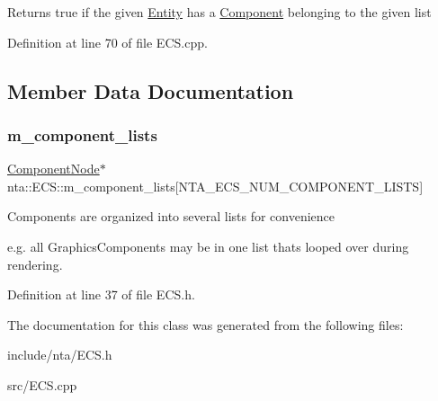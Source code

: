 Returns true if the given \hyperlink{classnta_1_1Entity}{Entity} has a \hyperlink{classnta_1_1Component}{Component} belonging to the given list 

Definition at line 70 of file E\+C\+S.\+cpp.



\subsection{Member Data Documentation}
\mbox{\label{classnta_1_1ECS_a2d45b9e54bcc636faac7cbb403b478bd}} 
\subsubsection{\texorpdfstring{m\+\_\+component\+\_\+lists}{m\_component\_lists}}
{\footnotesize\ttfamily \hyperlink{structnta_1_1utils_1_1LinkedNode}{Component\+Node}$\ast$ nta\+::\+E\+C\+S\+::m\+\_\+component\+\_\+lists\mbox{[}N\+T\+A\+\_\+\+E\+C\+S\+\_\+\+N\+U\+M\+\_\+\+C\+O\+M\+P\+O\+N\+E\+N\+T\+\_\+\+L\+I\+S\+TS\mbox{]}\hspace{0.3cm}{\ttfamily [private]}}

Components are organized into several lists for convenience

e.\+g. all Graphics\+Components may be in one list that\textquotesingle{}s looped over during rendering. 

Definition at line 37 of file E\+C\+S.\+h.



The documentation for this class was generated from the following files\+:\begin{DoxyCompactItemize}
\item 
include/nta/E\+C\+S.\+h\item 
src/E\+C\+S.\+cpp\end{DoxyCompactItemize}
